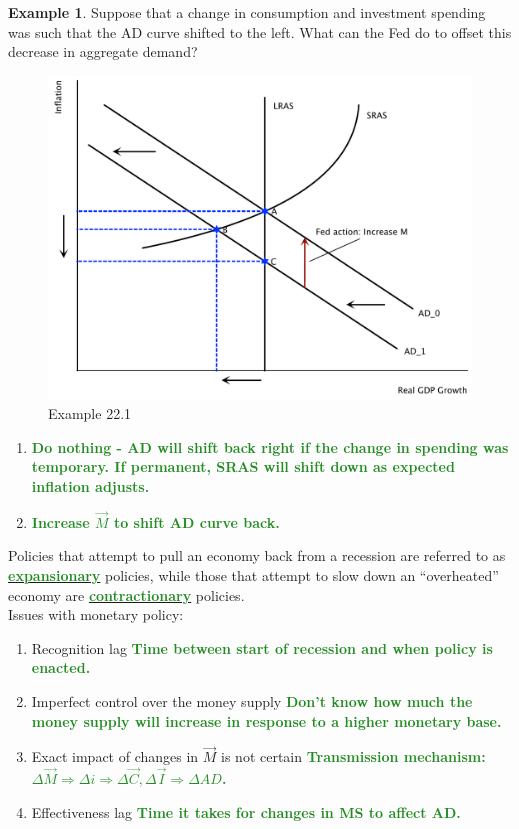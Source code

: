 \documentclass[11pt]{article}\usepackage[]{graphicx}\usepackage[]{color}
\theoremstyle{definition}
\newtheorem{exmp}{Example}[section]
\newcommand{\ddp}[1]{{\textbf{\textcolor{ForestGreen}{#1}}}}
\newcommand{\dd}[1]{{\underline{\textbf{\textcolor{ForestGreen}{#1}}}}}
\begin{document}
\begin{exmp} 
Suppose that a change in consumption and investment spending was such that the AD curve shifted to the left. What can the Fed do to offset this decrease in aggregate demand?

\begin{figure}[H]
	\centering
	\includegraphics[scale=.40]{plot102.pdf}
	\caption{Example 22.1}
\end{figure}

\begin{enumerate}
	\setlength{\itemsep}{1.5em}
	\item \ddp{Do nothing - AD will shift back right if the change in spending was temporary. If permanent, SRAS will shift down as expected inflation adjusts.}
	\item \ddp{Increase $\vec{M}$ to shift AD curve back.}
\end{enumerate}
\end{exmp}

Policies that attempt to pull an economy back from a recession are referred to as \dd{expansionary} policies, while those that attempt to slow down an ``overheated'' economy are \dd{contractionary} policies.
\\

Issues with monetary policy:
\begin{enumerate}
	\setlength{\itemsep}{1em}
	\item Recognition lag \ddp{Time between start of recession and when policy is enacted.}
	\item Imperfect control over the money supply \ddp{Don't know how much the money supply will increase in response to a higher monetary base.}
	\item Exact impact of changes in $\vec{M}$ is not certain \ddp{Transmission mechanism: $\Delta \vec{M} \Rightarrow \Delta i \Rightarrow \Delta \vec{C}, \Delta \vec{I} \Rightarrow \Delta AD$.}
	\item Effectiveness lag \ddp{Time it takes for changes in MS to affect AD.}
\end{enumerate}
\vspace{1em}
\end{document}
